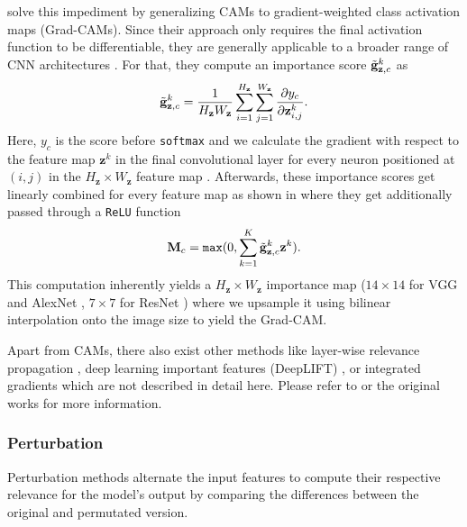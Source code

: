 \citet{SelvarajuCDVPB17} solve this impediment by generalizing CAMs to gradient-weighted class activation maps (Grad-CAMs). Since their approach only requires the final activation function to be differentiable, they are generally applicable to a broader range of CNN architectures \citep{SelvarajuCDVPB17, xie2020explainable}. For that, they compute an importance score $\Tilde{\mathbf{g}}_{\mathbf{z},c}^k$ as
\begin{equation}
\label{eq:grad_cam_importance}
     \Tilde{\mathbf{g}}_{\mathbf{z},c}^k = \frac{1}{H_\mathbf{z}W_\mathbf{z}} \sum_{i=1}^{H_\mathbf{z}} \sum_{j=1}^{W_\mathbf{z}} \frac{\partial y_c}{\partial \mathbf{z}^k_{i,j}}.
\end{equation}
Here, $y_c$ is the score before \texttt{softmax} and we calculate the gradient with respect to the feature map $\mathbf{z}^k$ in the final convolutional layer for every neuron positioned at $(i,j)$ in the $H_\mathbf{z} \times W_\mathbf{z}$ feature map \citep{SelvarajuCDVPB17, xie2020explainable}. Afterwards, these importance scores get linearly combined for every feature map as shown in  where they get additionally passed through a \texttt{ReLU} function
\begin{equation}
\label{eq:grad_cam_map}
    \mathbf{M}_c = \mathtt{max}(0,\sum_{k=1}^K\Tilde{\mathbf{g}}_{\mathbf{z},c}^k \mathbf{z}^k).
\end{equation}
This computation inherently yields a $H_\mathbf{z} \times W_\mathbf{z}$ importance map ($14 \times 14$ for VGG \citep{SimonyanZ14a} and AlexNet \citep{KrizhevskySH12}, $7 \times 7$ for ResNet \citep{HeZRS16}) where we upsample it using bilinear interpolation onto the image size to yield the Grad-CAM.

Apart from CAMs, there also exist other methods like layer-wise relevance propagation \citep{MontavonLBSM17, DingLLS17, LapuschkinBMMS16, Bach2015}, deep learning important features (DeepLIFT) \citep{ShrikumarGK17}, or integrated gradients \citep{SundararajanTY17} which are not described in detail here. Please refer to \citet{xie2020explainable} or the original works for more information.

\subsubsection{Perturbation}
Perturbation methods alternate the input features to compute their respective relevance for the model's output by comparing the differences between the original and permutated version.

